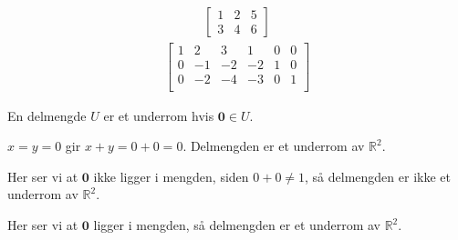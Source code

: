 \documentclass[11pt, a4paper, norsk]{NTNUoving}
\begin{document}
\ifx
\begin{oppgave}
    \begin{punkt}
        \begin{align*}
        
        
        \end{align*}
    \end{punkt}
\end{oppgave}
\begin{oppgave}
    \begin{punkt}
        
    \end{punkt}
\end{oppgave}
\begin{align*} 
    \begin{bmatrix}
    1 & 2 & 5\\
    3 & 4 & 6
    \end{bmatrix}
 \end{align*}
\begin{align*}
    \left[
        \begin{array}{ccc|ccc}
        1 & 2 & 3 & 1 & 0 & 0 \\
        0 & -1 & -2 & -2 & 1 & 0 \\
        0 & -2 & -4 & -3 & 0 & 1 \\
        \end{array}
    \right]     
\end{align*}
\fi

\begin{oppgave}
    \begin{punkt}
        En delmengde $U$ er et underrom hvis $\textbf{0} \in U$.
        
        $x=y=0$ gir $x+y=0+0=0$. Delmengden er et underrom av $\mathbb{R}^2$.
    \end{punkt}
    
    \begin{punkt}
        Her ser vi at $\textbf{0}$ ikke ligger i mengden, siden $0+0 \neq 1$, så delmengden er ikke et underrom av $\mathbb{R}^2$.
    \end{punkt}
    \begin{punkt}
        Her ser vi at $\textbf{0}$ ligger i mengden, så delmengden er et underrom av $\mathbb{R}^2$.
    \end{punkt}
\end{oppgave}
\end{document}
